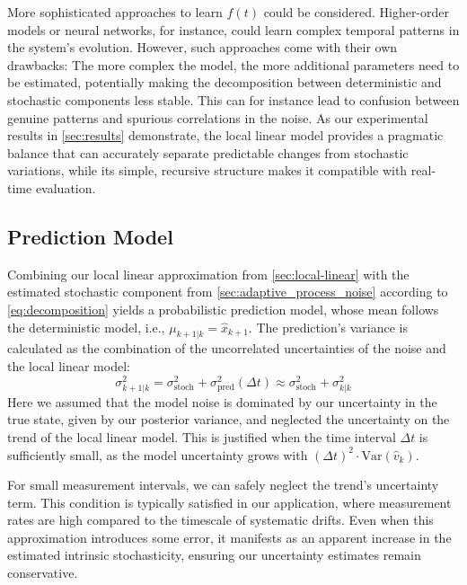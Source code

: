 \documentclass[9pt, twocolumn,superscriptaddress]{revtex4}
\begin{document}
More sophisticated approaches to learn $f(t)$ could be considered. Higher-order models or neural networks, for instance, could learn complex temporal patterns in the system's evolution. However, such approaches come with their own drawbacks: The more complex the model, the more additional parameters need to be estimated, potentially making the decomposition between deterministic and stochastic components less stable. This can for instance lead to confusion between genuine patterns and spurious correlations in the noise. As our experimental results in \cref{sec:results} demonstrate, the local linear model provides a pragmatic balance that can accurately separate predictable changes from stochastic variations, while its simple, recursive structure makes it compatible with real-time evaluation.

\subsection{Prediction Model}\label{sec:prediction}

Combining our local linear approximation from \cref{sec:local-linear} with the estimated stochastic component from \cref{sec:adaptive_process_noise} according to \cref{eq:decomposition} yields a probabilistic prediction model, whose mean follows the deterministic model, i.e., $\mu_{k+1|k}=\hat x_{k+1}$. The prediction's variance is calculated as the combination of the uncorrelated uncertainties of the noise and the local linear model:
\begin{equation}
\sigma^2_{k+1|k} = \sigma^2_\text{stoch} + \sigma^2_\text{pred}(\Delta t) \approx  \sigma^2_\text{stoch} + \sigma^2_{k|k}
\end{equation}
Here we assumed that the model noise is dominated by our uncertainty in the true state, given by our posterior variance, and neglected the uncertainty on the trend of the local linear model. This is justified when the time interval $\Delta t$ is sufficiently small, as the model uncertainty grows with $ (\Delta t)^2 \cdot \text{Var}(\hat{v}_k)$.

For small measurement intervals, we can safely neglect the trend's uncertainty term. This condition is typically satisfied in our application, where measurement rates are high compared to the timescale of systematic drifts. Even when this approximation introduces some error, it manifests as an apparent increase in the estimated intrinsic stochasticity, ensuring our uncertainty estimates remain conservative.
\end{document}

